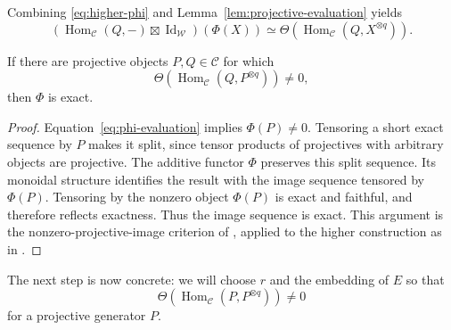 Combining \eqref{eq:higher-phi} and
Lemma~\ref{lem:projective-evaluation} yields
\begin{equation}\label{eq:phi-evaluation}
 (\operatorname{Hom}_{\mathcal C}(Q,-)\boxtimes
      \operatorname{Id}_{\mathcal W})(\Phi(X))
 \simeq\Theta(\operatorname{Hom}_{\mathcal C}
                       (Q,X^{\otimes q})).
\end{equation}

\begin{proposition}\label{prop:higher-exactness}
If there are projective objects $P,Q\in\mathcal C$ for which
\[
 \Theta(\operatorname{Hom}_{\mathcal C}(Q,P^{\otimes q}))\ne0,
\]
then $\Phi$ is exact.
\end{proposition}

\begin{proof}
Equation~\eqref{eq:phi-evaluation} implies $\Phi(P)\ne0$.
Tensoring a short exact sequence by $P$ makes it split, since
tensor products of projectives with arbitrary objects are
projective.  The additive functor $\Phi$ preserves this split
sequence.  Its monoidal structure identifies the result with
the image sequence tensored by $\Phi(P)$.
Tensoring by the nonzero object $\Phi(P)$ is exact and faithful,
and therefore reflects exactness.  Thus the image sequence is
exact. This argument is the nonzero-projective-image criterion of
\cite[Proposition~7.6 and Remark~7.7(i)]{EtingofOstrikFrobenius},
applied to the higher construction as in
\cite[Proposition~5.2.4]{CoulembierFlakeHigher}.
\end{proof}

The next step is now concrete: we will choose $r$ and the
embedding of $E$ so that
\[
 \Theta(\operatorname{Hom}_{\mathcal C}(P,P^{\otimes q}))\ne0
\]
for a projective generator $P$.
